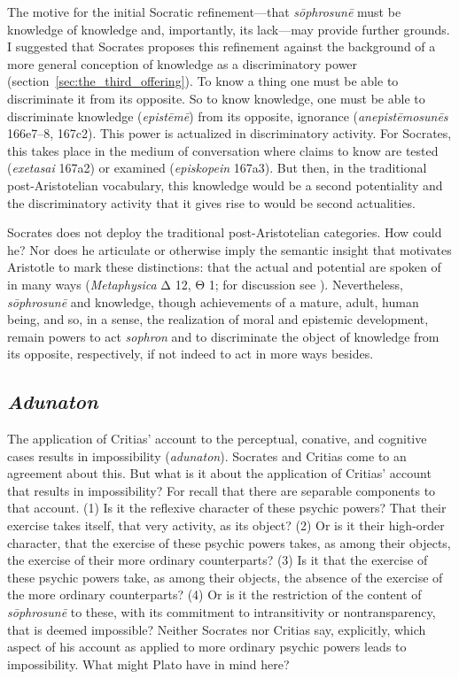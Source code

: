 The motive for the initial Socratic refinement—that \emph{sōphrosunē} must be knowledge of knowledge and, importantly, its lack—may provide further grounds. I suggested that Socrates proposes this refinement against the background of a more general conception of knowledge as a discriminatory power (section~\ref{sec:the_third_offering}). To know a thing one must be able to discriminate it from its opposite. So to know knowledge, one must be able to discriminate knowledge (\emph{epistēmē}) from its opposite, ignorance (\emph{anepistēmosunēs} 166e7–8, 167c2). This power is actualized in discriminatory activity. For Socrates, this takes place in the medium of conversation where claims to know are tested (\emph{exetasai} 167a2) or examined (\emph{episkopein} 167a3). But then, in the traditional post-Aristotelian vocabulary, this knowledge would be a second potentiality and the discriminatory activity that it gives rise to would be second actualities.

Socrates does not deploy the traditional post-Aristotelian categories. How could he? Nor does he articulate or otherwise imply the semantic insight that motivates Aristotle to mark these distinctions: that the actual and potential are spoken of in many ways (\emph{Metaphysica} {\sbl Δ} 12, {\sbl Θ} 1; for discussion see \citealt{Shields:2002jz}). Nevertheless, \emph{sōphrosunē} and knowledge, though achievements of a mature, adult, human being, and so, in a sense, the realization of moral and epistemic development, remain powers to act \emph{sophron} and to discriminate the object of knowledge from its opposite, respectively, if not indeed to act in more ways besides. 


\subsection{\emph{Adunaton}} %
\label{sub:_emph_adunaton}

The application of Critias' account to the perceptual, conative, and cognitive cases results in impossibility (\emph{adunaton}). Socrates and Critias come to an agreement about this. But what is it about the application of Critias' account that results in impossibility? For recall that there are separable components to that account. (1) Is it the reflexive character of these psychic powers? That their exercise takes itself, that very activity, as its object? (2) Or is it their high-order character, that the exercise of these psychic powers takes, as among their objects, the exercise of their more ordinary counterparts? (3) Is it that the exercise of these psychic powers take, as among their objects, the absence of the exercise of the more ordinary counterparts? (4) Or is it the restriction of the content of \emph{sōphrosunē} to these, with its commitment to intransitivity or nontransparency, that is deemed impossible? Neither Socrates nor Critias say, explicitly, which aspect of his account as applied to more ordinary psychic powers leads to impossibility. What might Plato have in mind here?

